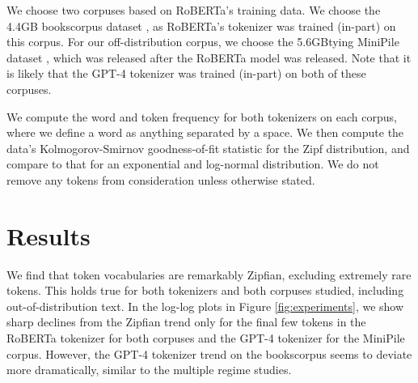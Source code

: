 \documentclass[11pt]{article}
\begin{document}
We choose two corpuses based on RoBERTa's training data. We choose the 4.4GB bookscorpus dataset \cite{zhu2015aligningbooksmoviesstorylike}, as RoBERTa's tokenizer was trained (in-part) on this corpus. For our off-distribution corpus, we choose the 5.6GBtying MiniPile dataset \cite{kaddour2023minipilechallengedataefficientlanguage}, which was released after the RoBERTa model was released. Note that it is likely that the GPT-4 tokenizer was trained (in-part) on both of these corpuses.

We compute the word and token frequency for both tokenizers on each corpus, where we define a word as anything separated by a space. We then compute the data's Kolmogorov-Smirnov goodness-of-fit statistic for the Zipf distribution, and compare to that for an exponential and log-normal distribution. We do not remove any tokens from consideration unless otherwise stated.

\section{Results}

We find that token vocabularies are remarkably Zipfian, excluding extremely rare tokens. This holds true for both tokenizers and both corpuses studied, including out-of-distribution text. In the log-log plots in Figure \ref{fig:experiments}, we show sharp declines from the Zipfian trend only for the final few tokens in the RoBERTa tokenizer for both corpuses and the GPT-4 tokenizer for the MiniPile corpus. However, the GPT-4 tokenizer trend on the bookscorpus seems to deviate more dramatically, similar to the multiple regime studies.
\end{document}

